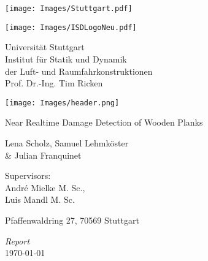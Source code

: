 \thispagestyle{empty}
\begin{center}
\texttt{[image: Images/Stuttgart.pdf]}
\end{center}

\begin{center}
\texttt{[image: Images/ISDLogoNeu.pdf]}

\end{center}

\begin{center}
{Universität Stuttgart\\}
{Institut für Statik und Dynamik\\}
{der Luft- und Raumfahrkonstruktionen\\}
{Prof. Dr.-Ing. Tim Ricken}
\end{center}
\vspace*{0.5cm}
\begin{center}
\texttt{[image: Images/header.png]}\\
\end{center}
\begin{center}
\vspace*{0.5cm}

{\huge Near Realtime Damage Detection of Wooden Planks
\vspace{0.3cm}}


\vspace{1.0cm}

{\large Lena Scholz, Samuel Lehmköster \\\& Julian Franquinet}


\vspace{1.6cm}

Supervisors:\\ André Mielke M. Sc.,\\ Luis Mandl M. Sc.
\vspace{1.2cm}

{\large Pfaffenwaldring 27, 70569 Stuttgart}

\vspace{0.5cm}
{\textit{Report}} \\ \bigskip
{\today}
\end{center}
\newpage
